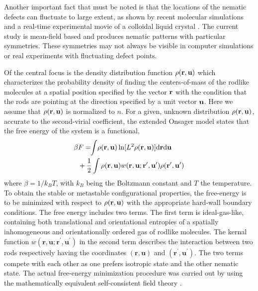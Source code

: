 \documentclass[prl,twocolumn,preprintnumbers,reprint]{revtex4}
\newcommand{\dd}{\mathrm{d}}
\newcommand{\intn}{\!\!\int\!}
\newcommand{\bu}{{\bf u}}
\newcommand{\br}{{\bf r}}
\begin{document}
Another important fact that must be noted is that the locations of the nematic defects can fluctuate to large extent, as shown by recent molecular simulations \cite{Humpert2017} and a real-time experimental movie of a colloidal liquid crystal \cite{Cortes2017}. The current study is  mean-field based and produces nematic patterns with particular symmetries. These symmetries may not always be visible in computer simulations or real experiments  with fluctuating defect points.\\


 Of the central focus is the density distribution function $\rho(\br,\bu)$ which characterizes the probability density of finding the centers-of-mass of the rodlike molecules at a spatial position specified by the vector $\br$ with the condition that the rods are pointing at the direction specified by a unit vector $\bu$. Here we assume that $\rho(\br,\bu)$ is normalized to $n$.
For a given, unknown distribution $\rho(\br,\bu)$, accurate to the second-virial coefficient, the extended Onsager model states that the free energy of the system is a functional,
\begin{equation}
\begin{aligned}
\label{Fdef}
 \beta &F=\intn\rho(\mathbf{r},\mathbf{u}) \ln [L^2\rho(\mathbf{r},\mathbf{u}) ] {\rm d}\mathbf{r} {\rm d}\mathbf{u}\\
&+ \frac{1}{2}\int\rho(\mathbf{r},\mathbf{u}) w(\mathbf{r},\mathbf{u};\mathbf{r}^\prime, \mathbf{u}^\prime)\rho(\mathbf{r}^\prime, \mathbf{u}^\prime)
\end{aligned}
\end{equation}
where $\beta = 1/k_B T$, with $k_B$ being the Boltzmann constant and $T$ the temperature. To obtain the stable or metastable configurational properties, the free-energy  is to be minimized with respect to $\rho(\br,\bu)$ with the appropriate hard-wall boundary conditions. The free energy includes two terms. The first term is ideal-gas-like, containing both translational and orientational entropies of a spatially inhomogeneous and orientationally ordered gas of rodlike molecules. The kernal function $w(\mathbf{r},\mathbf{u};\mathbf{r}^\prime, \mathbf{u}^\prime)$ in the second term describes the interaction between two rods respectively having the coordinates $(\mathbf{r},\mathbf{u})$ and $(\mathbf{r}^\prime, \mathbf{u}^\prime)$. The two terms compete with each other as one prefers isotropic state and the other nematic state. The actual free-energy minimization procedure was carried out by using the mathematically equivalent self-consistent field theory
\cite{Chen2013, Chen2016}.
\\
\end{document}
